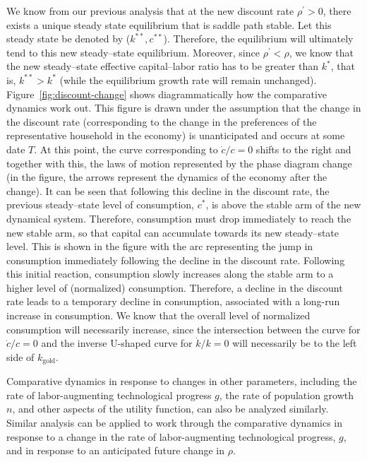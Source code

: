 \documentclass[\topdir/lecture\_notes.tex]{subfiles}
\begin{document}
We know from our previous analysis that at the new discount rate $\rho^{\prime}>0$, there exists a unique steady state equilibrium that is saddle path stable. Let this steady state be denoted by ($k^{* *}, c^{* *}$). Therefore, the equilibrium will ultimately tend to this new steady--state equilibrium. Moreover, since $\rho^{\prime}<\rho$, we know that the new steady--state effective capital--labor ratio has to be greater than $k^{*}$, that is, $k^{* *}>k^{*}$ (while the equilibrium growth rate will remain unchanged). Figure~\ref{fig:discount-change} shows diagrammatically how the comparative dynamics work out. This figure is drawn under the assumption that the change in the discount rate (corresponding to the change in the preferences of the representative household in the economy) is unanticipated and occurs at some date $T$. At this point, the curve corresponding to $\dot{c} / c=0$ shifts to the right and together with this, the laws of motion represented by the phase diagram change (in the figure, the arrows represent the dynamics of the economy after the change). It can be seen that following this decline in the discount rate, the previous steady--state level of consumption, $c^{*}$, is above the stable arm of the new dynamical system. Therefore, consumption must drop immediately to reach the new stable arm, so that capital can accumulate towards its new steady--state level. This is shown in the figure with the arc representing the jump in consumption immediately following the decline in the discount rate. Following this initial reaction, consumption slowly increases along the stable arm to a higher level of (normalized) consumption. Therefore, a decline in the discount rate leads to a temporary decline in consumption, associated with a long-run increase in consumption. We know that the overall level of normalized consumption will necessarily increase, since the intersection between the curve for $\dot{c} / c=0$ and the inverse U-shaped curve for $\dot{k} / k=0$ will necessarily be to the left side of $k_{\text{gold}}$.

Comparative dynamics in response to changes in other parameters, including the rate of labor-augmenting technological progress $g$, the rate of population growth $n$, and other aspects of the utility function, can also be analyzed similarly. Similar analysis can be applied to work through the comparative dynamics in response to a change in the rate of labor-augmenting technological progress, $g$, and in response to an anticipated future change in $\rho$.
\end{document}
